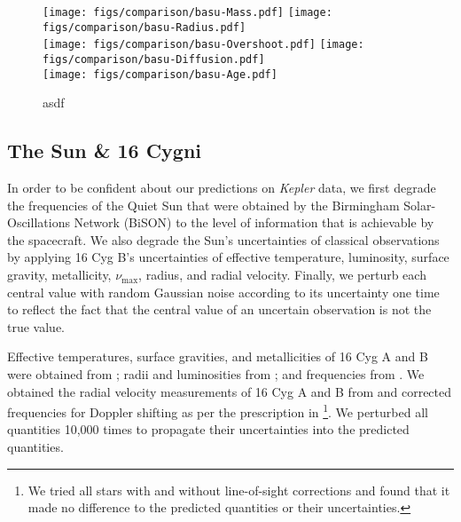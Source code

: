 \documentclass[manuscript]{aastex}
\begin{document}
\begin{figure*}
    \centering
    \texttt{[image: figs/comparison/basu-Mass.pdf]}\hfill
    \texttt{[image: figs/comparison/basu-Radius.pdf]}\\
    \texttt{[image: figs/comparison/basu-Overshoot.pdf]}\hfill
    \texttt{[image: figs/comparison/basu-Diffusion.pdf]}\\
    \texttt{[image: figs/comparison/basu-Age.pdf]}
    \caption{asdf \label{fig:hare-comparison}}
\end{figure*}

\subsection{The Sun \& 16 Cygni}
In order to be confident about our predictions on \emph{Kepler} data, we first degrade the frequencies of the Quiet Sun that were obtained by the Birmingham Solar-Oscillations Network (BiSON) \citep{2014MNRAS.439.2025D} to the level of information that is achievable by the spacecraft. %
We also degrade the Sun's uncertainties of classical observations by applying 16 Cyg B's uncertainties of effective temperature, luminosity, surface gravity, metallicity, $\nu_{\max}$, radius, and radial velocity. Finally, we perturb each central value with random Gaussian noise according to its uncertainty one time to reflect the fact that the central value of an uncertain observation is not the true value. 

Effective temperatures, surface gravities, and metallicities of 16 Cyg A and B were obtained from \citet{2009A&A...508L..17R}; radii and luminosities from \citet{2013MNRAS.433.1262W}; and frequencies from \citet{2015MNRAS.446.2959D}. We obtained the radial velocity measurements of 16 Cyg A and B from \citet{2002ApJS..141..503N} and corrected frequencies for Doppler shifting as per the prescription in \citet{2014MNRAS.445L..94D}\footnote{We tried all stars with and without line-of-sight corrections and found that it made no difference to the predicted quantities or their uncertainties.}. We perturbed all quantities 10,000 times to propagate their uncertainties into the predicted quantities. 
\end{document}
